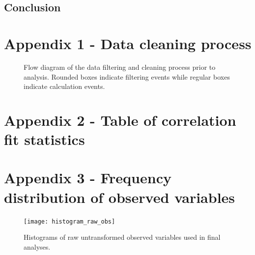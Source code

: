 \documentclass[11pt,a4paper]{article}
\begin{document}





\subsection{Conclusion}



\newpage{}
\appendix{}

\section*{Appendix 1 - Data cleaning process}

\begin{figure}[H]
\centering
	
	\caption{Flow diagram of the data filtering and cleaning process prior to analysis. Rounded boxes indicate filtering events while regular boxes indicate calculation events.}
	\label{data_clean_flow}
\end{figure}

\section*{Appendix 2 - Table of correlation fit statistics}



\section*{Appendix 3 - Frequency distribution of observed variables}

\begin{figure}[H]
\centering
	\texttt{[image: histogram\_raw\_obs]}
	\caption{Histograms of raw untransformed observed variables used in final analyses.}
	\label{histogram_raw_obs}
\end{figure}
\end{document}
